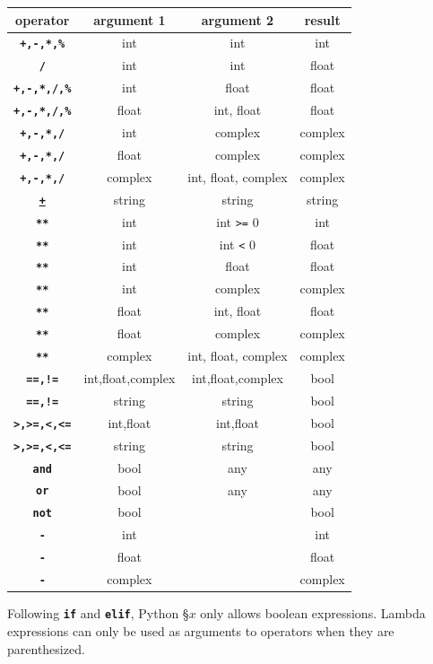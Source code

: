 \begin{center}
  \begin{tabular}{c|c|c|c}
    operator                     & argument  1 & argument 2 & result\\ \hline
    \texttt{\textbf{+,-,*,\%}}   & int         & int       & int\\
    \texttt{\textbf{/}}          & int         & int       & float\\
    \texttt{\textbf{+,-,*,/,\%}} & int         & float     & float\\
    \texttt{\textbf{+,-,*,/,\%}} & float       & int, float      & float\\
    \texttt{\textbf{+,-,*,/}}    & int         & complex   & complex\\
    \texttt{\textbf{+,-,*,/}}    & float       & complex   & complex\\
    \texttt{\textbf{+,-,*,/}}    & complex     & int, float, complex      & complex\\
    \texttt{\href{https://sourceacademy.org/sicpy/3.3.4\#p24}{\textbf{+}}}
    & string   & string     & string\\
    \texttt{\textbf{**}} & int   & int \verb|>=| 0   & int\\
    \texttt{\textbf{**}} & int   & int \verb|<| 0    & float\\
    \texttt{\textbf{**}} & int       & float     & float\\
    \texttt{\textbf{**}} & int       & complex   & complex\\
    \texttt{\textbf{**}} & float     & int, float      & float\\
    \texttt{\textbf{**}} & float     & complex   & complex\\
    \texttt{\textbf{**}} & complex   & int, float, complex     & complex\\
    \texttt{\textbf{==,!=}} & int,float,complex   & int,float,complex     & bool\\
    \texttt{\textbf{==,!=}} & string   & string     & bool\\
    \texttt{\textbf{>,>=,<,<=}} & int,float   & int,float     & bool\\
    \texttt{\textbf{>,>=,<,<=}} & string   & string     & bool\\
    \texttt{\textbf{and}} & bool & any & any\\
    \texttt{\textbf{or}}  & bool & any & any\\
    \texttt{\textbf{not}} & bool &     & bool\\
    \texttt{\textbf{-}}    & int &    & int\\
    \texttt{\textbf{-}}    & float &    & float\\
    \texttt{\textbf{-}}    & complex &    & complex

  \end{tabular}
\end{center}

Following \texttt{\textbf{if}} and \texttt{\textbf{elif}},
Python \S $x$ only allows boolean expressions. Lambda expressions can only
be used as arguments to operators when they are parenthesized.
